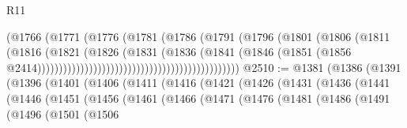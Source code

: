 \begin{lexlean}{R11}
\begin{coremodule}
                                                            (@1766
                                                              (@1771
                                                                (@1776
                                                                  (@1781
                                                                    (@1786
                                                                      (@1791
                                                                        (@1796
                                                                          (@1801
                                                                            (@1806
                                                                              (@1811
                                                                                (@1816
                                                                                  (@1821
                                                                                    (@1826
                                                                                      (@1831
                                                                                        (@1836
                                                                                          (@1841
                                                                                            (@1846
                                                                                              (@1851
                                                                                                (@1856
                                                                                                  @2414)))))))))))))))))))))))))))))))))))))))))))))))
@2510 := @1381
    (@1386
      (@1391
        (@1396
          (@1401
            (@1406
              (@1411
                (@1416
                  (@1421
                    (@1426
                      (@1431
                        (@1436
                          (@1441
                            (@1446
                              (@1451
                                (@1456
                                  (@1461
                                    (@1466
                                      (@1471
                                        (@1476
                                          (@1481
                                            (@1486
                                              (@1491
                                                (@1496
                                                  (@1501
                                                    (@1506

\end{coremodule}
\end{lexlean}
